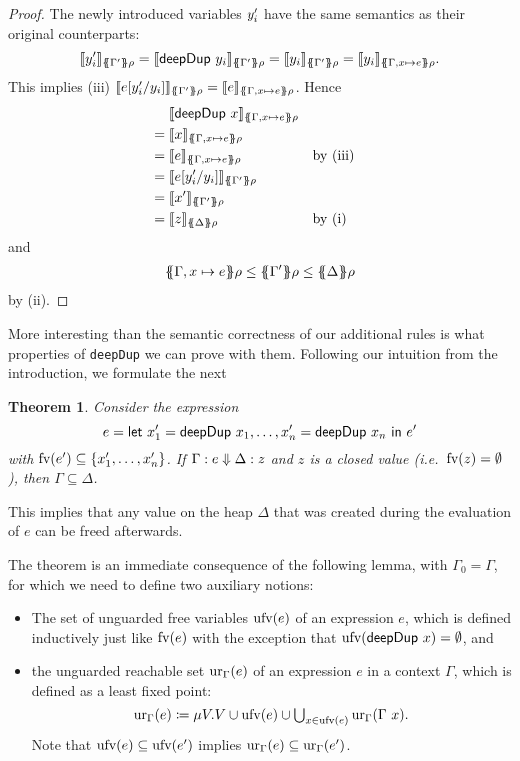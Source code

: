 \documentclass[preprint]{sigplanconf}
\newtheorem{theorem}{Theorem}
\theoremstyle{nonumberplain}
\newtheorem{proof}{Proof}
\newcommand{\li}{\lstinline[style=Haskell]}
\begin{document}
\begin{proof}
The newly introduced variables $y'_i$ have the same semantics as their original counterparts:
\[
\dsem{\fresh y_i}{\esem{\Gamma'}\rho}
= \dsem{\sDeepDup {y_i}}{\esem{\Gamma'}\rho}
= \dsem{y_i}{\esem{\Gamma'}\rho}
= \dsem{y_i}{\esem{\Gamma, x\mapsto e}\rho}.
\]
This implies (iii) $\dsem{e[\fresh y_i/y_i]}{\esem{\Gamma'}\rho} = \dsem{e}{\esem{\Gamma, x\mapsto e}\rho}$. Hence
\begin{align*}
&\phantom{{}={}}\dsem{\sDeepDup x}{\esem{\Gamma, x\mapsto e}\rho}\\
&= \dsem{x}{\esem{\Gamma, x\mapsto e}\rho}\\
&= \dsem{e}{\esem{\Gamma, x\mapsto e}\rho} &&\text{by (iii)}\\
&= \dsem{e[\fresh y_i/y_i]}{\esem{\Gamma'}\rho}\\
&= \dsem{\fresh x}{\esem{\Gamma'}\rho}\\
&= \dsem{z}{\esem \Delta \rho} &&\text{by (i)}
\end{align*}
and
\begin{align*}
\esem{\Gamma, x\mapsto e}\rho \le \esem{\Gamma'} \rho \le \esem{\Delta}\rho
\end{align*}
by (ii).
\end{proof}

More interesting than the semantic correctness of our additional rules is what properties of \li-deepDup- we can prove with them. Following our intuition from the introduction, we formulate the next
\begin{theorem}
Consider the expression
\[
e=\text{\textsf{let}}\ x_1' = \text{\textsf{deepDup}}\ x_1,\ldots,x_n'= \text{\textsf{deepDup}}\ x_n\ \text{\textsf{in}}\ e'
\]
with $\text{fv}(e') \subseteq \{x_1',\ldots,x_n'\}$. If $\Gamma : e \Downarrow \Delta : z$ and $z$ is a closed value (i.e.\ $\text{fv}(z) = \emptyset$), then $\Gamma \subseteq \Delta$.
\label{thm:deepdup}
\end{theorem}
This implies that any value on the heap $\Delta$ that was created during the evaluation of $e$ can be freed afterwards.

The theorem is an immediate consequence of the following lemma, with $\Gamma_0 = \Gamma$, for which we need to define two auxiliary notions:
\begin{itemize}
\item 
The set of unguarded free variables $\text{ufv}(e)$ of an expression $e$, which is defined inductively just like $\text{fv}(e)$ with the exception that $\text{ufv}(\text{\textsf{deepDup}}\ x) = \emptyset$, and 
\item the unguarded reachable set $\text{ur}_{\Gamma}(e)$ of an expression $e$ in a context $\Gamma$, which is defined as a least fixed point:
\[
\text{ur}_{\Gamma}(e) \coloneqq \mu V. V \cup \text{ufv}(e) \cup \textstyle\bigcup_{x\in \text{ufv}(e)}\text{ur}_{\Gamma}(\Gamma\ x).
\]
Note that $\text{ufv}(e) \subseteq \text{ufv}(e')$ implies $\text{ur}_{\Gamma}(e) \subseteq \text{ur}_{\Gamma}(e')$.
\end{itemize}
\end{document}
